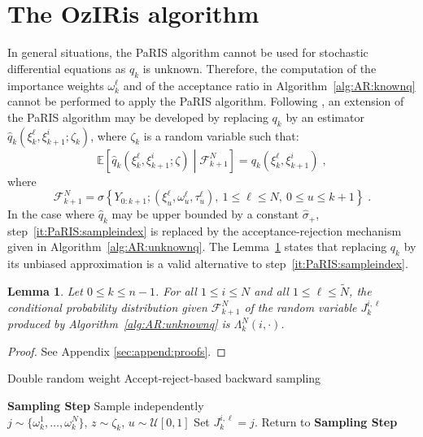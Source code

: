 \documentclass[12pt]{article}
\newcommand{\eqsp}{\;}
\newcommand{\1}{\mathrm{1}}
\newcommand{\qk}{q_{k}}
\newtheorem{lemma}{Lemma}
\begin{document}
\section{The OzIRis algorithm}
\label{sec:PaRIS:SDE}
In general situations, the PaRIS algorithm cannot be used for stochastic differential equations as $\qk$ is unknown. Therefore, the computation of the importance weights $\omega_{k}^{\ell}$ and of the acceptance ratio in Algorithm~\ref{alg:AR:knownq} cannot be performed to apply the PaRIS algorithm. Following \cite{olsson:strojby:2011},
an extension of the PaRIS algorithm may be developed by replacing $\qk$  by an  estimator $\widehat{q}_k(\xi^{\ell}_{k},\xi_{k+1}^{i};\zeta_k)$, where $\zeta_k$ is a random variable such that:
\[
\mathbb{E}\left[\widehat{q}_k(\xi^{\ell}_{k},\xi_{k+1}^{i};\zeta)\middle| \mathcal{F}_{k+1}^N\right] = \qk(\xi^{\ell}_{k},\xi_{k+1}^{i})\eqsp,
\]
where 
\[
\mathcal{F}_{k+1}^N = \sigma\left\{Y_{0:k+1};(\xi^{\ell}_{u},\omega^{\ell}_{u},\tau^{\ell}_{u}),~1\le \ell\le N,~0\le u\le k+1\right\}\eqsp.
\]
In the case where $\widehat{q}_k$ may be upper bounded by a constant $\hat{\sigma}_+$, step~\eqref{it:PaRIS:sampleindex} is replaced by the acceptance-rejection mechanism given in Algorithm~\ref{alg:AR:unknownq}. The Lemma~\ref{lem:AR:unbiased} states that replacing  $\qk$ by its unbiased approximation is a valid alternative to step~\eqref{it:PaRIS:sampleindex}.
\begin{lemma}
\label{lem:AR:unbiased}
Let $0\le k\le n-1$.  For all $1\le i \le N$ and all $1\le \ell \le \widetilde{N}$, the conditional probability distribution given $\mathcal{F}_{k+1}^N$ of the random variable $J_{k}^{i,\ell}$ produced by Algorithm~\ref{alg:AR:unknownq} is  $\Lambda_{k}^N(i,\cdot)$. 
\end{lemma}
\begin{proof}
See Appendix \ref{sec:append:proofs}.
\end{proof}
\begin{algorithm}[hb]
\caption{Double random weight Accept-reject-based backward sampling}
\begin{algorithmic}
\STATE \textbf{\sc Sampling Step} Sample independently\\ $j\sim \{\omega_{k}^1,\dots,\omega_{k}^N\}$, $z\sim\zeta_k$, $u\sim \mathcal{U}[0,1]$
\IF{ $$u \leq \frac{\widehat{\qk}(\xi_{k}^j,\xi_{k+1}^i,z)}{\hat{\sigma}_+},$$}
\STATE Set $J_k^{i,\ell} = j$.
\ELSE 
\STATE Return to \textbf{\sc Sampling Step}
\ENDIF
\ENDFOR
\ENDFOR
\end{algorithmic}
\label{alg:AR:unknownq}
\end{algorithm}
\end{document}
